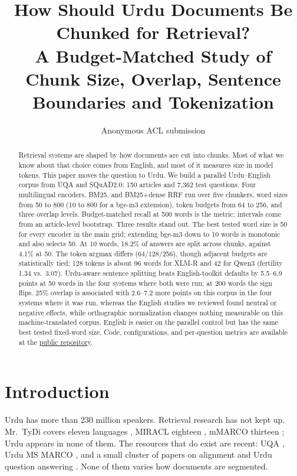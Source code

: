 \documentclass[11pt]{article}
\title{How Should Urdu Documents Be Chunked for Retrieval?\\
A Budget-Matched Study of Chunk Size, Overlap, Sentence Boundaries and Tokenization}
\author{Anonymous ACL submission}
\begin{document}
\nolinenumbers
\maketitle

\begin{abstract}
Retrieval systems are shaped by how documents are cut into chunks. Most of what we know about
that choice comes from English, and most of it measures size in model tokens. This paper moves the
question to Urdu. We build a parallel Urdu--English corpus from UQA and SQuAD2.0: 150 articles and
7{,}362 test questions. Four multilingual encoders, BM25, and BM25+dense RRF run over five chunkers,
word sizes from 50 to 800 (10 to 800 for a bge-m3 extension), token budgets from 64 to 256, and
three overlap levels. Budget-matched recall at 500 words is the metric; intervals come from an
article-level bootstrap. Three results stand out. The best tested word size is 50 for every encoder
in the main grid; extending bge-m3 down to 10 words is monotonic and also selects 50. At 10 words,
18.2\% of answers are split across chunks, against 4.1\% at 50. The token argmax differs
(64/128/256), though adjacent
budgets are statistically tied;
128 tokens is about 96 words for XLM-R and 42 for Qwen3 (fertility 1.34 vs.\ 3.07). Urdu-aware
sentence splitting beats English-toolkit defaults by 5.5--6.9 points at 50 words in the four systems
where both were run; at 200 words the sign flips. 25\% overlap is associated with 2.6--7.2 more
points on this corpus in the four systems where it was run, whereas the English studies we reviewed
found neutral or negative effects, while orthographic normalization changes nothing measurable on
this machine-translated corpus. English is easier on the parallel control but
has the same best tested fixed-word size. Code, configurations, and per-question metrics are
available at the \href{https://github.com/devxyasir/urdu-chunking-strategy}{public repository}.
\end{abstract}

\section{Introduction}

Urdu has more than 230 million speakers. Retrieval research has not kept up. Mr.\ TyDi covers
eleven languages \citep{zhang2021mr}, MIRACL eighteen \citep{zhang2022making}, mMARCO thirteen
\citep{bonifacio2021mmarco}; Urdu appears in none of them. The resources that do exist are recent:
UQA \citep{arif2024uqa}, Urdu MS MARCO \citep{butt2024enabling}, and a small cluster of papers on
alignment and Urdu question answering \citep{faheem-etal-2026-beyond,ahmad-etal-2026-drrag}. None of
them varies how documents are segmented.
\end{document}
